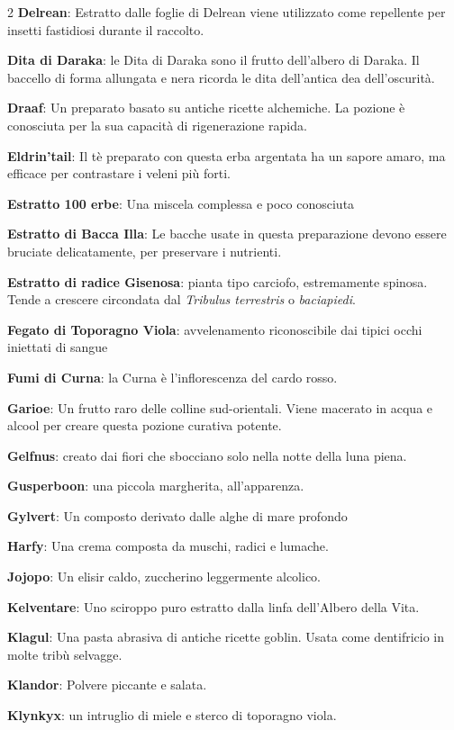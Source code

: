 \begin{multicols}{2}
\textbf{Delrean}: Estratto dalle foglie di Delrean viene utilizzato come repellente per insetti fastidiosi durante il raccolto.

\textbf{Dita di Daraka}: le Dita di Daraka sono il frutto dell'albero di Daraka. Il baccello di forma allungata e nera ricorda le dita dell'antica dea dell'oscurità.

\textbf{Draaf}: Un preparato basato su antiche ricette alchemiche. La pozione è conosciuta per la sua capacità di rigenerazione rapida.

\textbf{Eldrin'tail}: Il tè preparato con questa erba argentata ha un sapore amaro, ma efficace per contrastare i veleni più forti.

\textbf{Estratto 100 erbe}: Una miscela complessa e poco conosciuta

\textbf{Estratto di Bacca Illa}: Le bacche usate in questa preparazione devono essere bruciate delicatamente, per preservare i nutrienti.

\textbf{Estratto di radice Gisenosa}: pianta tipo carciofo, estremamente spinosa. Tende a crescere circondata dal \emph{Tribulus terrestris} o \emph{baciapiedi}.

\textbf{Fegato di Toporagno Viola}: avvelenamento riconoscibile dai tipici occhi iniettati di sangue

\textbf{Fumi di Curna}: la Curna è l'inflorescenza del cardo rosso.

\textbf{Garioe}: Un frutto raro delle colline sud-orientali. Viene macerato in acqua e alcool per creare questa pozione curativa potente.

\textbf{Gelfnus}: creato dai fiori che sbocciano solo nella notte della luna piena.

\textbf{Gusperboon}: una piccola margherita, all'apparenza.

\textbf{Gylvert}: Un composto derivato dalle alghe di mare profondo

\textbf{Harfy}: Una crema composta da muschi, radici e lumache.

\textbf{Jojopo}: Un elisir caldo, zuccherino leggermente alcolico.

\textbf{Kelventare}: Uno sciroppo puro estratto dalla linfa dell’Albero della Vita.

\textbf{Klagul}: Una pasta abrasiva di antiche ricette goblin. Usata come dentifricio in molte tribù selvagge.

\textbf{Klandor}: Polvere piccante e salata.

\textbf{Klynkyx}: un intruglio di miele e sterco di toporagno viola.


\end{multicols}
